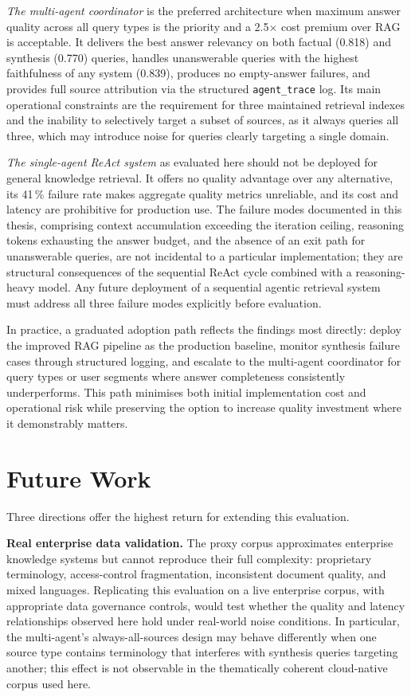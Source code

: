 \textit{The multi-agent coordinator} is the preferred architecture when maximum answer quality across all query types is the priority and a 2.5$\times$ cost premium over RAG is acceptable. It delivers the best answer relevancy on both factual (0.818) and synthesis (0.770) queries, handles unanswerable queries with the highest faithfulness of any system (0.839), produces no empty-answer failures, and provides full source attribution via the structured \texttt{agent\_trace} log. Its main operational constraints are the requirement for three maintained retrieval indexes and the inability to selectively target a subset of sources, as it always queries all three, which may introduce noise for queries clearly targeting a single domain.

\textit{The single-agent ReAct system} as evaluated here should not be deployed for general knowledge retrieval. It offers no quality advantage over any alternative, its 41\,\% failure rate makes aggregate quality metrics unreliable, and its cost and latency are prohibitive for production use. The failure modes documented in this thesis, comprising context accumulation exceeding the iteration ceiling, reasoning tokens exhausting the answer budget, and the absence of an exit path for unanswerable queries, are not incidental to a particular implementation; they are structural consequences of the sequential ReAct cycle combined with a reasoning-heavy model. Any future deployment of a sequential agentic retrieval system must address all three failure modes explicitly before evaluation.

In practice, a graduated adoption path reflects the findings most directly: deploy the improved RAG pipeline as the production baseline, monitor synthesis failure cases through structured logging, and escalate to the multi-agent coordinator for query types or user segments where answer completeness consistently underperforms. This path minimises both initial implementation cost and operational risk while preserving the option to increase quality investment where it demonstrably matters.


\section{Future Work}

Three directions offer the highest return for extending this evaluation.

\textbf{Real enterprise data validation.} The proxy corpus approximates enterprise knowledge systems but cannot reproduce their full complexity: proprietary terminology, access-control fragmentation, inconsistent document quality, and mixed languages. Replicating this evaluation on a live enterprise corpus, with appropriate data governance controls, would test whether the quality and latency relationships observed here hold under real-world noise conditions. In particular, the multi-agent's always-all-sources design may behave differently when one source type contains terminology that interferes with synthesis queries targeting another; this effect is not observable in the thematically coherent cloud-native corpus used here.

